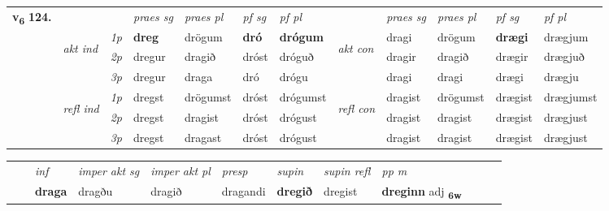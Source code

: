 \begin{tabular}{llllllllllll} \toprule
\multirow{4}{*}{{{\textbf{v{\textsubscript{6}}} \Large{\textbf{124.}}}}}  & &   &  \textit{praes sg}  & \textit{praes pl}  &\textit{ pf sg} & \textit{pf pl} &  &  \textit{praes sg}  & \textit{praes pl}  & \textit{pf sg} & \textit{pf pl } \\*
	\cmidrule{4-7} \cmidrule{9-12}
 & \multirow{3}{*}{\begin{turn}{90}\textit{akt ind}\end{turn}} & {\textit{1p}} & \textbf{dreg} & drögum    & \textbf{dró} & \textbf{drógum} & \multirow{3}{*}{\begin{turn}{90}\textit{akt con}\end{turn}} &dragi & drögum & \textbf{drægi} & drægjum\\*
& &  {\textit{2p}} &  dregur  & dragið   & dróst & dróguð & & dragir & dragið & drægir & drægjuð \\*
& &  {\textit{3p}} & dregur & draga   & dró & drógu & & dragi & dragi& drægi & drægju  \\*
\cmidrule{4-7} \cmidrule{9-12}
 &\multirow{3}{*}{\begin{turn}{90}\textit{refl ind}\end{turn}} & {\textit{1p}} & dregst & drögumst    & dróst & drógumst & \multirow{3}{*}{\begin{turn}{90}\textit{refl con}\end{turn}}  &dragist & drögumst & drægist & drægjumst\\*
 &&  {\textit{2p}} &  dregst  & dragist   & dróst & drógust & &dragist & dragist & drægist & drægjust \\*
& &  {\textit{3p}} & dregst & dragast   & dróst & drógust & & dragist & dragist& drægist & drægjust  \\*
\cmidrule{4-7} \cmidrule{9-12}
\end{tabular}


\begin{tabular}{llllllllllll}
 & & \textit{inf} & \textit{imper akt sg} & \textit{imper akt pl}   & \textit{presp} & \textit{supin} & \textit{supin refl} & \textit{pp m}     \\*
  & & \textbf{draga} & dragðu  & dragið   & dragandi &  \textbf{dregið} & dregist & \textbf{dreginn} adj \textbf{\textsubscript{6w}} \\*
\cmidrule{1-12}
\end{tabular}



